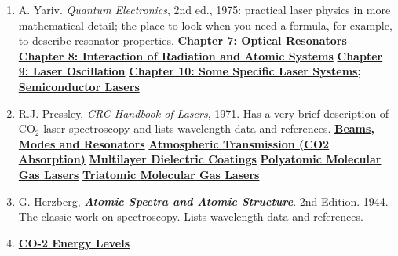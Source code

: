 \documentclass{../lab}
\begin{document}
\begin{enumerate}
    \item A. Yariv. \emph{Quantum Electronics}, 2nd ed., 1975: practical laser physics in more mathematical detail; the place to look when you need a formula, for example, to describe resonator properties. 
    \newline
    \href{https://drive.google.com/file/d/1JyXjFpTsTucOdfpbb7cy3-BmFYjWoT5k/view?usp=drive_link}{\textbf{Chapter 7: Optical Resonators}}
    \newline
    \href{https://drive.google.com/file/d/1kqU44nbHVutx5t1secZi1YTX9d-TVMm9/view?usp=drive_link}{\textbf{Chapter 8: Interaction of Radiation and Atomic Systems}}
    \newline \href{https://drive.google.com/file/d/18TF7G7R6yR08L0JWmr2NW8pZtGV4S2n0/view?usp=drive_link}{\textbf{Chapter 9: Laser Oscillation}}
    \newline
    \href{https://drive.google.com/file/d/11lGx-BJ7OXOExiBDyDTtI0ga-MA_NOtB/view?usp=drive_link}{\textbf{Chapter 10: Some Specific Laser Systems; Semiconductor Lasers}}
    
    \item R.J. Pressley,
    \emph{CRC Handbook of Lasers}, 1971. Has a very brief description of CO$_2$ laser spectroscopy and lists wavelength data and references.
    \newline
    \href{https://drive.google.com/file/d/1EzPdlMJJZ3DlKQtyqUBHF-riCeXccphk/view?usp=drive_link}{\textbf{Beams, Modes and Resonators}}
    \newline    \href{https://drive.google.com/file/d/1ktIBdxAbufNCc7c1uowcywX4y7D276WB/view?usp=drive_link}{\textbf{Atmospheric Transmission (CO2 Absorption)}}
    \newline    \href{https://drive.google.com/file/d/1b0AuuS0S7wGhB1Ezk_s2gB7bp6jHML5R/view?usp=drive_link}{\textbf{Multilayer Dielectric Coatings}}
    \newline    \href{https://drive.google.com/file/d/1y5t32bHPhXtdVhS4L53dEVZzcDqpK6Xn/view?usp=drive_link}{\textbf{Polyatomic Molecular Gas Lasers}}
    \newline    \href{https://drive.google.com/file/d/1ni7yjMpDM_Cfhm5GOtueiyAwk3c2OaFz/view?usp=drive_link}{\textbf{Triatomic Molecular Gas Lasers}}
    
    \item G. Herzberg, \emph{\href{https://drive.google.com/file/d/1WSyJRwUKQZkj335oLa1WTh3_NwQC4f2T/view?usp=drive_link}{\textbf{Atomic Spectra and Atomic Structure}}}. 2nd Edition. 1944. The classic work on spectroscopy. Lists wavelength data and references.

    \item \href{https://drive.google.com/file/d/1WSyJRwUKQZkj335oLa1WTh3_NwQC4f2T/view?usp=drive_link}{\textbf{CO-2 Energy Levels}}

\end{enumerate}
\end{document}
